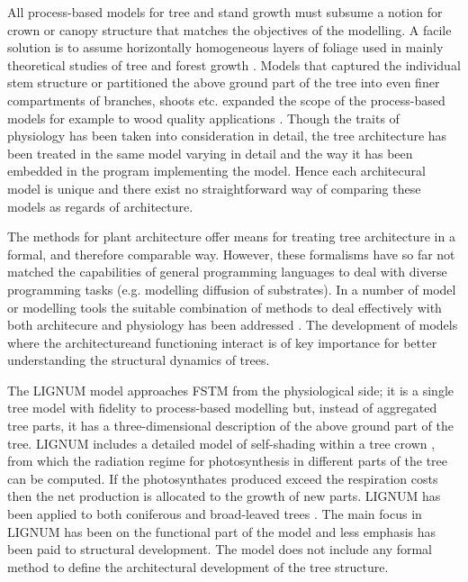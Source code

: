 All  process-based  models  \citep{landsberg:86}  for tree  and  stand
growth  must subsume  a  notion  for crown  or  canopy structure  that
matches  the objectives  of the  modelling.  A  facile solution  is to
assume  horizontally  homogeneous layers  of  foliage  used in  mainly
theoretical     studies     of      tree     and     forest     growth
\citep{hari:82,sievanen:93}.  Models that captured the individual stem
structure or partitioned  the above ground part of  the tree into even
finer  compartments  of  branches,  shoots  etc.  \citep{kellomaki:95,
  makela:97-1}  expanded the  scope  of the  process-based models  for
example to wood  quality applications \citep{kellomaki:99, makela:03}.
Though the traits  of physiology has been taken  into consideration in
detail,  the tree  architecture has  been  treated in  the same  model
varying in  detail and  the way  it has been  embedded in  the program
implementing the  model.  Hence each architecural model  is unique and
there  exist  no straightforward  way  of  comparing  these models  as
regards of architecture.


The methods  for plant architecture \citep{pp:90,dereffye:97,godin:99}
offer means for treating tree  architecture in a formal, and therefore
comparable way. However, these formalisms  have so far not matched the
capabilities  of general  programming languages  to deal  with diverse
programming  tasks (e.g.   modelling  diffusion of  substrates). In  a
number of model or modelling tools the suitable combination of methods
to  deal effectively  with both  architecure and  physiology  has been
addressed \citep{kurth:99, eschenbach:00, karwowski:03, yan:04}.  The
development of  models where the  architectureand functioning interact
is of key importance  for better understanding the structural dynamics
of trees.

The LIGNUM model approaches FSTM  from the physiological side; it is a
single tree model  \citep{perttunen:96} with fidelity to process-based
modelling  \citep[see  e.g.][]{nikinmaa:92, sievanen:93,  makela:97-1}
but,  instead of  aggregated tree  parts, it  has  a three-dimensional
description of the  above ground part of the  tree.  LIGNUM includes a
detailed    model    of    self-shading    within   a    tree    crown
\citep{perttunen:96,  perttunen:01}, from  which the  radiation regime
for photosynthesis in different parts of the tree can be computed.  If
the photosynthates produced exceed  the respiration costs then the net
production is allocated  to the growth of new  parts.  LIGNUM has been
applied to both coniferous \citep{perttunen:96,lo:99} and broad-leaved
trees \citep{perttunen:01}.  The main focus  in LIGNUM has been on the
functional  part of  the  model and  less  emphasis has  been paid  to
structural development.  The model  does not include any formal method
to define the architectural development of the tree structure.

